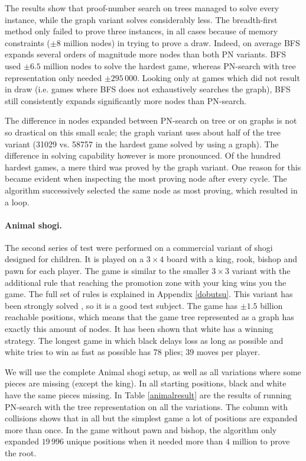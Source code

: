 \documentclass{article}
\begin{document}
The results show that proof-number search on trees managed to solve every instance, while the graph variant solves considerably less. The
breadth-first method only failed to prove three instances, in all cases because of memory constraints ($\pm8$ million nodes) in trying to prove a draw.
Indeed, on average BFS expands several orders of magnitude more nodes than both PN variants. BFS used $\pm6.5$ million nodes to solve the hardest
game, whereas PN-search with tree representation only needed $\pm295\,000$. Looking only at games which did not result in draw (i.e. games where
BFS does not exhaustively searches the graph), BFS still consistently expands significantly more nodes than PN-search.

The difference in nodes expanded between PN-search on tree or on graphs is not so drastical
on this small scale; the graph variant uses about half of the tree variant (31029 vs. 58757 in the hardest game solved by using a graph).
The difference in solving capability however is more pronounced. Of the hundred hardest games, a mere third was proved by the graph variant.
One reason for this became evident when inspecting the most proving node after every cycle. The algorithm successively selected the same
node as most proving, which resulted in a loop.

\paragraph{Animal shogi.} The second series of test were performed on a commercial variant of shogi designed for children. It is played on a $3 \times 4$
board with a king, rook, bishop and pawn for each player.
The game is similar to the smaller $3 \times 3$ variant with the additional rule that reaching the promotion zone with your king wins you the game.
The full set of rules is explained in Appendix \ref{dobutsu}. This variant has been strongly solved
\cite{tetsuroanimal}, so it is a good test subject. The game has $\pm1.5$ billion reachable positions, which means that the game tree represented as a graph has exactly
this amount of nodes. It has been shown that white has a winning strategy. The longest game in which black
delays loss as long as possible and white tries to win as fast as possible has 78 plies; 39 moves per player. 

We will use the complete Animal shogi setup, as well as all variations where some pieces are missing (except the king). In all starting positions, black and white have the
same pieces missing. In Table \ref{animalresult} are the results of running PN-search with the tree representation on all the variations. The column with collisions shows that
in all but the simplest game a lot of positions are expanded more than once. In the game without pawn and bishop, the algorithm only expanded $19\,996$ unique positions
when it needed more than $4$ million to prove the root.
\end{document}
